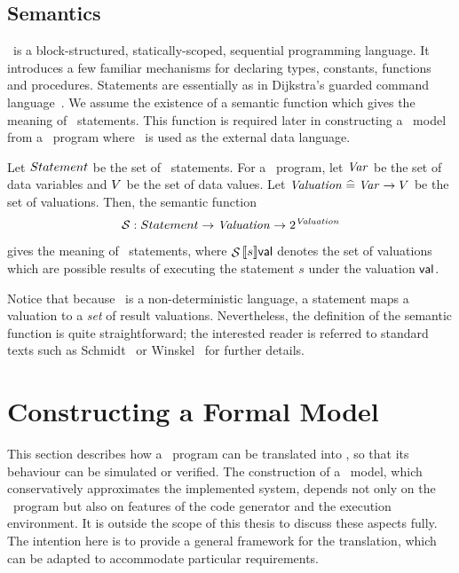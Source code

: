 \subsection{Semantics}\label{ss:prsdmlsemantics}
\sdml\ is a block-structured, statically-scoped,
sequential programming language. It introduces a few familiar
mechanisms for declaring types, constants, functions and
procedures. Statements are essentially as in Dijkstra's
guarded command language~\cite{dij:76}. We assume the existence of a
semantic function which gives the meaning of \sdml\ statements. This
function is required later in constructing a \bcandle\ model from a
\candle\ program where \sdml\ is used as the external data language.

Let ${Statement}$ be the set of \sdml\ statements.  For a \sdml\ program,
let ${\text{\it Var\/}}$ be the set of data variables and $V$ be the set of data
values. Let ${\text{\it Valuation\/}} \mathrel{\widehat=} {\text{\it Var\/}} \rightarrow V$ be the set of
valuations. Then, the semantic function 
\[ \evalCanSmntFN : \canSmnt \fun \valuation \fun 2^\valuation \]
gives the meaning of \sdml\ statements, where $\evalCanSmnt{s}\val$
denotes the set of valuations which are possible results of executing
the statement $s$ under the valuation ${\mathop{\sf val}}$.

Notice that because \sdml\ is a non-deterministic language, a
statement maps a valuation to a \emph{set} of result valuations.
Nevertheless, the definition of the semantic function is quite
straightforward; the interested reader is referred to standard texts
such as Schmidt~\cite{sch:86} or Winskel~\cite{win:93} for further
details.
   
\section{Constructing a Formal Model\label{sec:prtrans}}
This section describes how a \candle\ program can be translated into
\bcandle, so that its behaviour can be simulated or verified. The
construction of a \bcandle\ model, which conservatively approximates
the implemented system, depends not only on the \candle\ program but
also on features of the code generator and the execution
environment.  It is outside the scope of this thesis to discuss these
aspects fully.  The intention here is to provide a general
framework for the translation, which can be adapted to accommodate
particular requirements.

